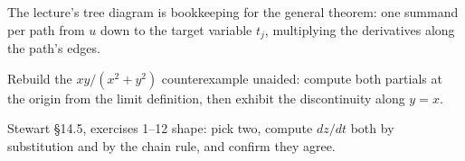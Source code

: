 \begin{remark}
The lecture's tree diagram is bookkeeping for the general theorem: one summand per path from $u$
down to the target variable $t_j$, multiplying the derivatives along the path's edges.
\end{remark}

\begin{checkyourself}
  \item Rebuild the $xy/(x^2+y^2)$ counterexample unaided: compute both partials at the origin
        from the limit definition, then exhibit the discontinuity along $y=x$.
  \item Stewart \S14.5, exercises 1--12 shape: pick two, compute $dz/dt$ both by substitution
        and by the chain rule, and confirm they agree.
\end{checkyourself}
